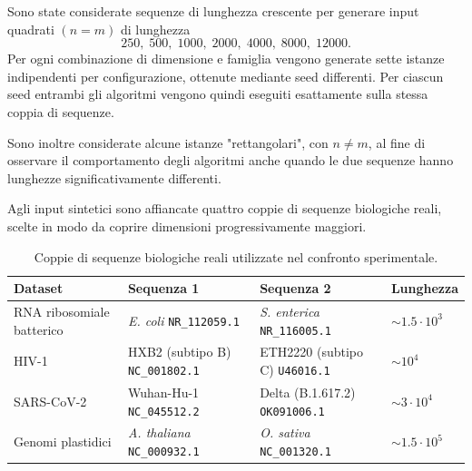 Sono state considerate sequenze di lunghezza crescente per generare input quadrati $(n=m)$ di lunghezza
\[
    250,\;500,\;1000,\;2000,\;4000,\;8000,\;12000.
\]
Per ogni combinazione di dimensione e famiglia vengono generate sette istanze indipendenti per configurazione, ottenute mediante seed differenti.
Per ciascun seed entrambi gli algoritmi vengono quindi eseguiti esattamente sulla stessa coppia di sequenze. 

Sono inoltre considerate alcune istanze "rettangolari", con $n \neq m$, al fine di osservare il comportamento degli algoritmi anche quando le due
sequenze hanno lunghezze significativamente differenti.

Agli input sintetici sono affiancate quattro coppie di sequenze biologiche reali, scelte in modo da coprire dimensioni
progressivamente maggiori.

\begin{table}[htbp]
    \centering
    \small
    \begin{tabularx}{\textwidth}{
        >{\raggedright\arraybackslash}p{}
        >{\raggedright\arraybackslash}X
        >{\raggedright\arraybackslash}X
        >{\centering\arraybackslash}p{}
    }
        \toprule
        \textbf{Dataset} &
        \textbf{Sequenza 1} &
        \textbf{Sequenza 2} &
        \textbf{Lunghezza} \\
        \midrule

        RNA ribosomiale batterico &
        \textit{E. coli} \newline
        \texttt{NR\_112059.1} &
        \textit{S. enterica} \newline
        \texttt{NR\_116005.1} &
        $\sim 1.5 \cdot 10^{3}$ \\

        \addlinespace

        HIV-1 &
        HXB2 (subtipo B) \newline
        \texttt{NC\_001802.1} &
        ETH2220 (subtipo C) \newline
        \texttt{U46016.1} &
        $\sim 10^{4}$ \\

        \addlinespace

        SARS-CoV-2 &
        Wuhan-Hu-1 \newline
        \texttt{NC\_045512.2} &
        Delta (B.1.617.2) \newline
        \texttt{OK091006.1} &
        $\sim 3 \cdot 10^{4}$ \\

        \addlinespace

        Genomi plastidici &
        \textit{A. thaliana} \newline
        \texttt{NC\_000932.1} &
        \textit{O. sativa} \newline
        \texttt{NC\_001320.1} &
        $\sim 1.5 \cdot 10^{5}$ \\

        \bottomrule
    \end{tabularx}
    \caption{Coppie di sequenze biologiche reali utilizzate nel confronto sperimentale.}
    \label{tab:dataset-reali}
\end{table}

